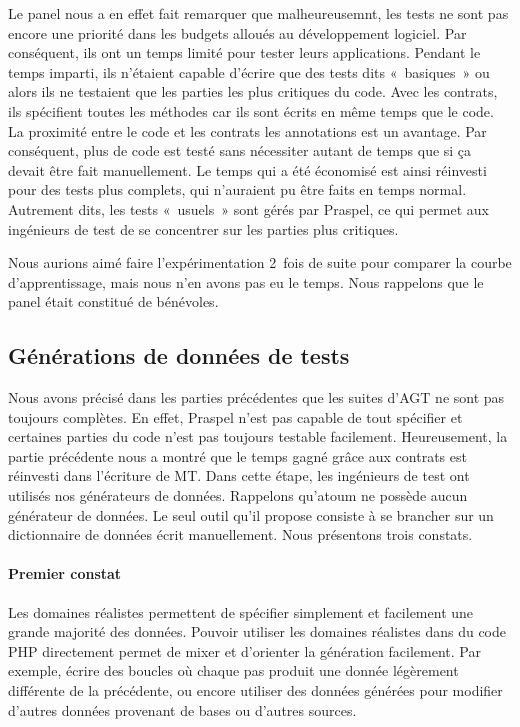 Le panel nous a en effet fait remarquer que malheureusemnt, les tests ne sont
pas encore une priorité dans les budgets alloués au développement logiciel. Par
conséquent, ils ont un temps limité pour tester leurs applications. Pendant le
temps imparti, ils n'étaient capable d'écrire que des tests dits «~basiques~» ou
alors ils ne testaient que les parties les plus critiques du code. Avec les
contrats, ils spécifient toutes les méthodes car ils sont écrits en même temps
que le code. La proximité entre le code et les contrats \via les annotations est
un avantage. Par conséquent, plus de code est testé sans nécessiter autant de
temps que si ça devait être fait manuellement. Le temps qui a été économisé est
ainsi réinvesti pour des tests plus complets, qui n'auraient pu être faits en
temps normal. Autrement dits, les tests «~usuels~» sont gérés par Praspel, ce
qui permet aux ingénieurs de test de se concentrer sur les parties plus
critiques.

Nous aurions aimé faire l'expérimentation 2~fois de suite pour comparer la
courbe d'apprentissage, mais nous n'en avons pas eu le temps. Nous rappelons que
le panel était constitué de bénévoles.

\subsection{Générations de données de tests}
%

Nous avons précisé dans les parties précédentes que les suites d'AGT ne sont pas
toujours complètes. En effet, Praspel n'est pas capable de tout spécifier et
certaines parties du code n'est pas toujours testable facilement. Heureusement,
la partie précédente nous a montré que le temps gagné grâce aux contrats est
réinvesti dans l'écriture de MT. Dans cette étape, les ingénieurs de test ont
utilisés nos générateurs de données. Rappelons qu'atoum ne possède aucun
générateur de données. Le seul outil qu'il propose consiste à se brancher sur un
dictionnaire de données écrit manuellement. Nous présentons trois constats.

\paragraph{Premier constat} Les domaines réalistes permettent de spécifier
simplement et facilement une grande majorité des données. Pouvoir utiliser les
domaines réalistes dans du code PHP directement permet de mixer et d'orienter la
génération facilement. Par exemple, écrire des boucles où chaque pas produit une
donnée légèrement différente de la précédente, ou encore utiliser des données
générées pour modifier d'autres données provenant de bases ou d'autres sources.

